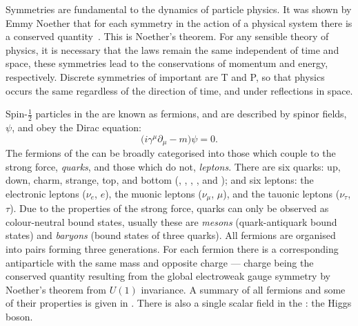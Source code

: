 Symmetries are fundamental to the dynamics of particle physics.
It was shown by Emmy Noether that for each symmetry in the action of a physical system there is a
conserved quantity~\cite{Noether}.
This is Noether's theorem.
For any sensible theory of physics, it is necessary that the laws remain the same independent of
time and space, these symmetries lead to the conservations of momentum and energy, respectively.
Discrete symmetries of important are \gls{T} and \gls{P}, so that physics occurs the same
regardless of the direction of time, and under reflections in space.


Spin-$\tfrac12$ particles in the \sm are known as fermions, and
are described by spinor fields, $\psi$, and obey the Dirac equation:
\begin{equation}
  \big(i\gamma^\mu\partial_\mu - m\big)\psi = 0.
  \label{th:eq:dirac}
\end{equation}
The fermions of the \sm can be broadly categorised into those which couple to the strong force,
\emph{quarks}, and those which do not, \emph{leptons}.
There are six quarks: up, down, charm, strange, top, and bottom (\uquark, \dquark, \cquark,
\squark, \tquark and \bquark); and six leptons:
the electronic leptons ($\nu_e$, $e$),
the muonic leptons ($\nu_\mu$, $\mu$),
and the tauonic leptons ($\nu_\tau$, $\tau$).
Due to the properties of the strong force, quarks can only be observed as colour-neutral bound
states, usually these are
\emph{mesons} (quark-antiquark bound states) and \emph{baryons} (bound states of three quarks).
All fermions are organised into pairs forming three generations.
For each fermion there is a corresponding antiparticle with the same mass and opposite charge ---
charge being the conserved quantity resulting from the global electroweak gauge symmetry by
Noether's theorem from $U(1)$ invariance.
A summary of all fermions and some of their properties is given in .
There is also a single scalar field in the \sm: the Higgs boson.

